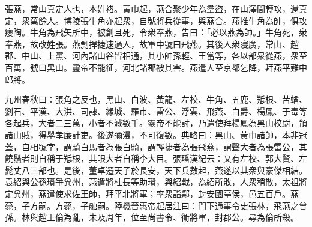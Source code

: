 
\begin{pinyinscope}
張燕，常山真定人也，本姓褚。黃巾起，燕合聚少年為羣盜，在山澤間轉攻，還真定，衆萬餘人。博陵張牛角亦起衆，自號將兵從事，與燕合。燕推牛角為帥，俱攻癭陶。牛角為飛矢所中，被創且死，令衆奉燕，告曰：「必以燕為帥。」牛角死，衆奉燕，故改姓張。燕剽捍捷速過人，故軍中號曰飛燕。其後人衆寖廣，常山、趙郡、中山、上黨、河內諸山谷皆相通，其小帥孫輕、王當等，各以部衆從燕，衆至百萬，號曰黑山。靈帝不能征，河北諸郡被其害。燕遣人至京都乞降，拜燕平難中郎將。

九州春秋曰：張角之反也，黑山、白波、黃龍、左校、牛角、五鹿、羝根、苦蝤、劉石、平漢、大洪、司隷、緣城、羅市、雷公、浮雲、飛燕、白爵、楊鳳、于毒等各起兵，大者二三萬，小者不減數千。靈帝不能討，乃遣使拜楊鳳為黑山校尉，領諸山賊，得舉孝廉計吏。後遂彌漫，不可復數。典略曰：黑山、黃巾諸帥，本非冠蓋，自相號字，謂騎白馬者為張白騎，謂輕捷者為張飛燕，謂聲大者為張雷公，其饒鬚者則自稱于羝根，其眼大者自稱李大目。張璠漢紀云：又有左校、郭大賢、左髭丈八三部也。是後，董卓遷天子於長安，天下兵數起，燕遂以其衆與豪傑相結。袁紹與公孫瓚爭兾州，燕遣將杜長等助瓚，與紹戰，為紹所敗，人衆稍散，太祖將定兾州，燕遣使求佐王師，拜平北將軍；率衆詣鄴，封安國亭侯，邑五百戶。燕薨，子方嗣。方薨，子融嗣。陸機晉惠帝起居注曰：門下通事令史張林，飛燕之曾孫。林與趙王倫為亂，未及周年，位至尚書令、衞將軍，封郡公。尋為倫所殺。


\end{pinyinscope}